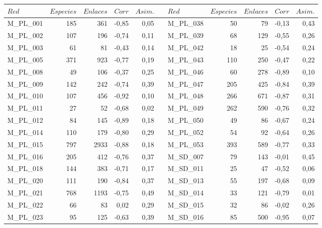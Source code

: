 \begin{table}[h!]
\fontsize{2.2mm}{2.2mm}\selectfont
  \centering
      \begin{tabular}{lrrrrrlrrrr}
    \toprule
    $Red$  & $Especies$ & $Enlaces$ & $Corr$ & $Asim.$ &      & $Red$  & $Especies$ & $Enlaces$ & $Corr$& $Asim.$ \\
    \midrule
      M\_PL\_001 & 185  & 361  & -0,85 & 0,05 &      & M\_PL\_038 & 50   & 79   & -0,13 & 0,43 \\
    M\_PL\_002 & 107  & 196  & -0,74 & 0,11 &      & M\_PL\_039 & 68   & 129  & -0,55 & 0,26 \\
    M\_PL\_003 & 61   & 81   & -0,43 & 0,14 &      & M\_PL\_042 & 18   & 25   & -0,54 & 0,24 \\
    M\_PL\_005 & 371  & 923  & -0,77 & 0,19 &      & M\_PL\_043 & 110  & 250  & -0,47 & 0,22 \\
    M\_PL\_008 & 49   & 106  & -0,37 & 0,25 &      & M\_PL\_046 & 60   & 278  & -0,89 & 0,10 \\
    M\_PL\_009 & 142  & 242  & -0,74 & 0,39 &      & M\_PL\_047 & 205  & 425  & -0,84 & 0,39 \\
    M\_PL\_010 & 107  & 456  & -0,92 & 0,10 &      & M\_PL\_048 & 266  & 671  & -0,87 & 0,31 \\
    M\_PL\_011 & 27   & 52   & -0,68 & 0,02 &      & M\_PL\_049 & 262  & 590  & -0,76 & 0,32 \\
    M\_PL\_012 & 84   & 145  & -0,89 & 0,18 &      & M\_PL\_050 & 49   & 86   & -0,67 & 0,24 \\
    M\_PL\_014 & 110  & 179  & -0,80 & 0,29 &      & M\_PL\_052 & 54   & 92   & -0,64 & 0,26 \\
    M\_PL\_015 & 797  & 2933 & -0,88 & 0,18 &      & M\_PL\_053 & 393  & 589  & -0,77 & 0,33 \\
    M\_PL\_016 & 205  & 412  & -0,76 & 0,37 &      & M\_SD\_007 & 79   & 143  & -0,01 & 0,45 \\
    M\_PL\_018 & 144  & 383  & -0,71 & 0,17 &      & M\_SD\_011 & 25   & 47   & -0,52 & 0,06 \\
    M\_PL\_020 & 111  & 190  & -0,84 & 0,37 &      & M\_SD\_013 & 55   & 197  & -0,68 & 0,09 \\
    M\_PL\_021 & 768  & 1193 & -0,75 & 0,49 &      & M\_SD\_014 & 33   & 121  & -0,79 & 0,01 \\
    M\_PL\_022 & 66   & 83   & 0,02 & 0,29 &      & M\_SD\_015 & 32   & 86   & -0,02 & 0,26 \\
    M\_PL\_023 & 95   & 125  & -0,63 & 0,39 &      & M\_SD\_016 & 85   & 500  & -0,95 & 0,07 \\

\end{tabular}
\end{table}
